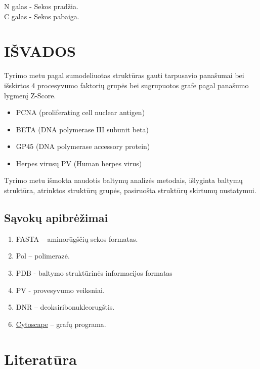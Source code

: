\documentclass[a4paper,12pt]{article}
\begin{document}
N galas - Sekos pradžia.\\
C galas - Sekos pabaiga.\\

\clearpage



\section{IŠVADOS}

Tyrimo metu pagal sumodeliuotas struktūras gauti tarpusavio panašumai bei išskirtos 4 procesyvumo faktorių grupės bei sugrupuotos grafe pagal panašumo lygmenį Z-Score.
\begin{itemize}
	\item PCNA (proliferating cell nuclear antigen)
	\item BETA (DNA polymerase III subunit beta)
	\item GP45 (DNA polymerase accessory protein)
	\item Herpes virusų PV (Human herpes virus)
\end{itemize}



\qquad Tyrimo metu išmokta naudotis baltymų analizės metodais, išlyginta baltymų struktūra, atrinktos struktūrų grupės, pasiruošta struktūrų skirtumų nustatymui.

\vspace{5cm}

\subsection{Sąvokų apibrėžimai}

\begin{enumerate}
	\item FASTA –  aminorūgščių sekos formatas.
	\item Pol – polimerazė.
	\item PDB - baltymo struktūrinės informacijos formatas
	\item PV - provesyvumo veiksniai.
	\item DNR – deoksiribonukleorugštis.
	\item \hyperlink{Cytoscape}{Cytoscape} – grafų programa.
\end{enumerate}

\clearpage
	
\section{Literatūra}
\end{document}

